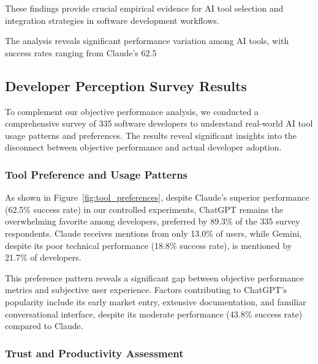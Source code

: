 \documentclass[conference]{IEEEtran}
\begin{document}
These findings provide crucial empirical evidence for AI tool selection and integration strategies in software development workflows.

The analysis reveals significant performance variation among AI tools, with success rates ranging from Claude's 62.5%

\subsection{Developer Perception Survey Results}

To complement our objective performance analysis, we conducted a comprehensive survey of 335 software developers to understand real-world AI tool usage patterns and preferences. The results reveal significant insights into the disconnect between objective performance and actual developer adoption.

\subsubsection{Tool Preference and Usage Patterns}

As shown in Figure~\ref{fig:tool_preferences}, despite Claude's superior performance (62.5\% success rate) in our controlled experiments, ChatGPT remains the overwhelming favorite among developers, preferred by 89.3\% of the 335 survey respondents. Claude receives mentions from only 13.0\% of users, while Gemini, despite its poor technical performance (18.8\% success rate), is mentioned by 21.7\% of developers.

This preference pattern reveals a significant gap between objective performance metrics and subjective user experience. Factors contributing to ChatGPT's popularity include its early market entry, extensive documentation, and familiar conversational interface, despite its moderate performance (43.8\% success rate) compared to Claude.

\subsubsection{Trust and Productivity Assessment}
\end{document}
